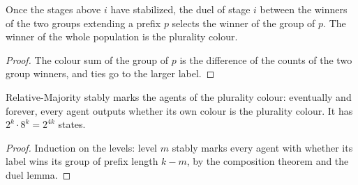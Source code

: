 \begin{lemma}\label{lem:em-duel}
\leanok{}
Once the stages above $i$ have stabilized, the duel of stage $i$ between the winners of the two
groups extending a prefix $p$ selects the winner of the group of $p$. The winner of the whole
population is the plurality colour.
\end{lemma}
\begin{proof}\leanok
The colour sum of the group of $p$ is the difference of the counts of the two group winners, and
ties go to the larger label.
\end{proof}

\begin{theorem}\label{thm:em-relative}
\leanok{}
Relative-Majority stably marks the agents of the plurality colour: eventually and forever, every
agent outputs whether its own colour is the plurality colour. It has $2^k \cdot 8^k = 2^{4k}$
states.
\end{theorem}
\begin{proof}\leanok
Induction on the levels: level $m$ stably marks every agent with whether its label wins its group
of prefix length $k - m$, by the composition theorem and the duel lemma.
\end{proof}


\begin{abstract}
A shared library for finite stochastic dynamics using normalized real weights,
finite sums, and limits of finite-time probabilities. These are generic library
results, rather than statements attributed to a particular opinion-dynamics paper.
\end{abstract}

